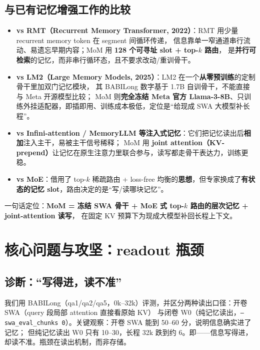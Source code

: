 \documentclass[11pt,a4paper]{ctexart}
\begin{document}
\subsection{与已有记忆增强工作的比较}
\begin{itemize}
  \item \textbf{vs RMT（Recurrent Memory Transformer, 2022）}：RMT 用少量 recurrent memory token 在 segment 间循环传递，
        信息靠单一窄通道串行流动、易遗忘早期内容；MoM 用 \textbf{128 个可寻址 slot + top-$k$ 路由}，
        是\textbf{并行可检索}的记忆，而非串行循环态，且不要求改动/重训骨干。
  \item \textbf{vs LM2（Large Memory Models, 2025）}：LM2 在一个\textbf{从零预训练}的定制骨干里加双门记忆模块，
        其 BABILong 数字基于 1.7B 自训骨干，不能直接与 Meta 开源模型比较；
        MoM 则\textbf{完全冻结 Meta 官方 Llama-3-8B}、只训练外挂适配器，即插即用、训练成本极低，定位是“给现成 SWA 大模型补长程”。
  \item \textbf{vs Infini-attention / MemoryLLM 等注入式记忆}：它们把记忆读出后\textbf{相加}注入主干，易被主干信号稀释；
        MoM 用 \textbf{joint attention（KV-prepend）}让记忆在原生注意力里联合参与，读写都走骨干表达力，训练更稳。
  \item \textbf{vs MoE}：借用了 top-$k$ 稀疏路由 + loss-free 均衡的\textbf{思想}，但专家换成了\textbf{有状态的记忆 slot}，路由决定的是“写/读哪块记忆”。
\end{itemize}
一句话定位：\textbf{MoM = 冻结 SWA 骨干 + MoE 式 top-$k$ 路由的层次记忆 + joint-attention 读写}，
在固定 KV 预算下为现成大模型补回长程上下文。

\section{核心问题与攻坚：readout 瓶颈}
\subsection{诊断：“写得进，读不准”}
我们用 BABILong（qa1/qa2/qa5，0k--32k）评测，并区分两种读出口径：开卷 SWA（query 段局部 attention 直接看原始 KV）
与闭卷 W0（纯记忆读出，\texttt{--swa\_eval\_chunks 0}）。关键观察：开卷 SWA 能到 50--60 分，说明信息确实进了记忆；
但纯记忆读出 W0 只有 10--30，长程 32k 跌到约 6。即——信息写得进，却读不准。瓶颈在读出机制，而非存储。
\end{document}
